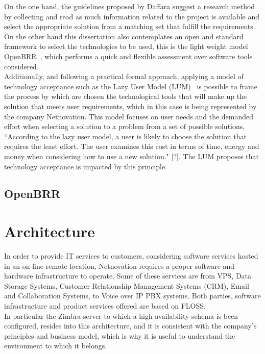 \documentclass[a4paper, 12pt]{book}
\begin{document}
\noindent On the one hand, the guidelines proposed by Daffara suggest a research method by collecting and read as much information related to the project is available and select the appropriate solution from a matching set that fulfill the requirements. On the other hand this dissertation also contemplates an open and standard framework to select the technologies to be used, this is the light weight model OpenBRR~\cite{Wasserman et. all}, which performs a quick and flexible assessment over software tools considered.\\

\noindent Additionally, and following a practical formal approach, applying a model of technology acceptance such as the Lazy User Model (LUM)~\cite{Collan and Tetard} is possible to frame the process by which are chosen the technological tools that will make up the solution that meets user requirements, which in this case is being represented by the company Netnovation. This model focuses on user needs and the demanded effort when selecting a solution to a problem from a set of possible solutions, ``According to the lazy user model, a user is likely to choose the solution that requires the least effort. The user examines this cost in terms of time, energy and money when considering how to use a new solution." [?]. The LUM proposes that technology acceptance is impacted by this principle.


\section{OpenBRR}
\label{sec:openbrr}




%
\chapter{Architecture}
\label{chap:architecture}

In order to provide IT services to customers, considering software services hosted in an on-line remote location, Netnovation requires a proper software and hardware infrastructure to operate. Some of these services are from VPS, Data Storage Systems, Customer Relationship Management Systems (CRM), Email and Collaboration Systems, to Voice over IP PBX systems. Both parties, software infrastructure and product services offered are based on FLOSS.\\

\noindent In particular the Zimbra server to which a high availability schema is been configured, resides into this architecture, and it is consistent with the company's principles and business model, which is why it is useful to understand the environment to which it belongs.
\end{document}
